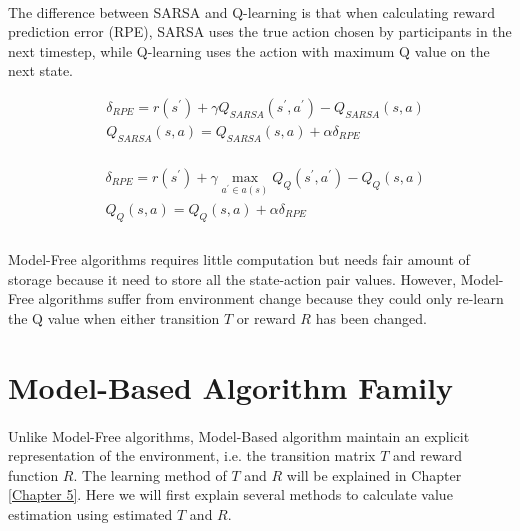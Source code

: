 \paragraph{}
The difference between SARSA and Q-learning is that when calculating reward prediction error (RPE), SARSA uses the true action chosen by participants in the next timestep, while Q-learning uses the action with maximum Q value on the next state.

\begin{equation}
\begin{aligned}
&\delta_{RPE}=r(s^{\prime})+\gamma Q_{SARSA}(s^{\prime}, a^{\prime})-Q_{SARSA}(s,a) \\
&Q_{SARSA}(s,a)=Q_{SARSA}(s,a)+\alpha \delta_{RPE} \\
\end{aligned}
\label{eqn:SARSA0}
\end{equation}

\begin{equation}
\begin{aligned}
&\delta_{RPE}=r(s^{\prime})+\gamma \max_{a^{\prime} \in a(s)}{Q_{Q}(s^{\prime}, a^{\prime})}- Q_{Q}(s,a) \\
&Q_Q(s,a)=Q_Q(s,a)+\alpha \delta_{RPE} \\
\end{aligned}
\label{eqn:Q-Learning0}
\end{equation}

\paragraph{}
Model-Free algorithms requires little computation but needs fair amount of storage because it need to store all the state-action pair values. However, Model-Free algorithms suffer from environment change because they could only re-learn the Q value when either transition $T$ or reward $R$ has been changed. 




\section{Model-Based Algorithm Family}
\paragraph{}
Unlike Model-Free algorithms, Model-Based algorithm maintain an explicit representation of the environment, i.e. the transition matrix $T$ and reward function $R$. The learning method of $T$ and $R$ will be explained in Chapter \ref{Chapter 5}. Here we will first explain several methods to calculate value estimation using estimated $T$ and $R$. 
